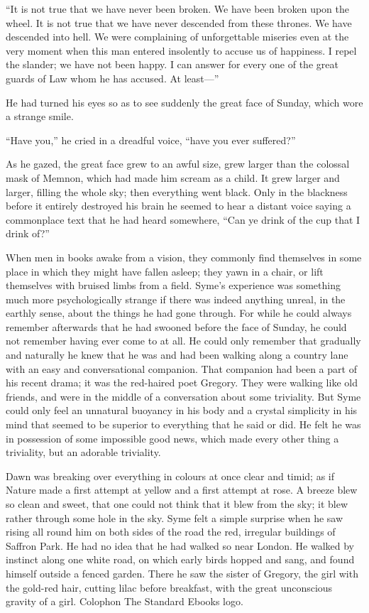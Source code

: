 “It is not true that we have never been broken. We have been broken upon the wheel. It is not true that we have never descended from these thrones. We have descended into hell. We were complaining of unforgettable miseries even at the very moment when this man entered insolently to accuse us of happiness. I repel the slander; we have not been happy. I can answer for every one of the great guards of Law whom he has accused. At least⁠—”

He had turned his eyes so as to see suddenly the great face of Sunday, which wore a strange smile.

“Have you,” he cried in a dreadful voice, “have you ever suffered?”

As he gazed, the great face grew to an awful size, grew larger than the colossal mask of Memnon, which had made him scream as a child. It grew larger and larger, filling the whole sky; then everything went black. Only in the blackness before it entirely destroyed his brain he seemed to hear a distant voice saying a commonplace text that he had heard somewhere, “Can ye drink of the cup that I drink of?”

When men in books awake from a vision, they commonly find themselves in some place in which they might have fallen asleep; they yawn in a chair, or lift themselves with bruised limbs from a field. Syme’s experience was something much more psychologically strange if there was indeed anything unreal, in the earthly sense, about the things he had gone through. For while he could always remember afterwards that he had swooned before the face of Sunday, he could not remember having ever come to at all. He could only remember that gradually and naturally he knew that he was and had been walking along a country lane with an easy and conversational companion. That companion had been a part of his recent drama; it was the red-haired poet Gregory. They were walking like old friends, and were in the middle of a conversation about some triviality. But Syme could only feel an unnatural buoyancy in his body and a crystal simplicity in his mind that seemed to be superior to everything that he said or did. He felt he was in possession of some impossible good news, which made every other thing a triviality, but an adorable triviality.

Dawn was breaking over everything in colours at once clear and timid; as if Nature made a first attempt at yellow and a first attempt at rose. A breeze blew so clean and sweet, that one could not think that it blew from the sky; it blew rather through some hole in the sky. Syme felt a simple surprise when he saw rising all round him on both sides of the road the red, irregular buildings of Saffron Park. He had no idea that he had walked so near London. He walked by instinct along one white road, on which early birds hopped and sang, and found himself outside a fenced garden. There he saw the sister of Gregory, the girl with the gold-red hair, cutting lilac before breakfast, with the great unconscious gravity of a girl.
Colophon
The Standard Ebooks logo.


